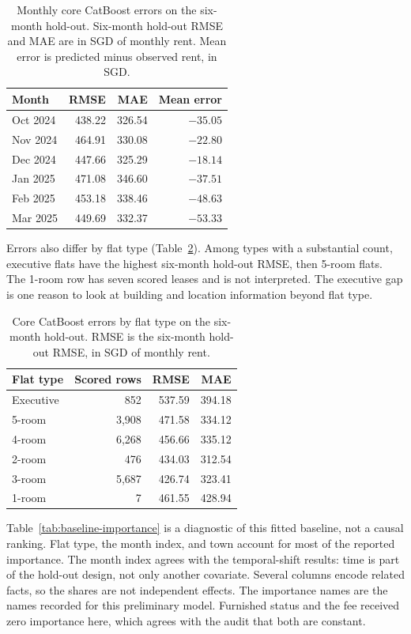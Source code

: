 \documentclass[11pt,a4paper]{article}
\begin{document}
\begin{table}[htbp]
\centering
\caption{Monthly core CatBoost errors on the six-month hold-out.
Six-month hold-out RMSE and MAE are in SGD of monthly rent.
Mean error is predicted minus observed rent, in SGD.}
\label{tab:monthly-errors}
\small
\begin{tabular}{lrrr}
\toprule
Month & RMSE & MAE & Mean error \\
\midrule
Oct 2024 & 438.22 & 326.54 & $-35.05$ \\
Nov 2024 & 464.91 & 330.08 & $-22.80$ \\
Dec 2024 & 447.66 & 325.29 & $-18.14$ \\
Jan 2025 & 471.08 & 346.60 & $-37.51$ \\
Feb 2025 & 453.18 & 338.46 & $-48.63$ \\
Mar 2025 & 449.69 & 332.37 & $-53.33$ \\
\bottomrule
\end{tabular}
\end{table}

Errors also differ by flat type (Table~\ref{tab:flat-type-errors}).
Among types with a substantial count, executive flats have the highest six-month hold-out RMSE, then 5-room flats.
The 1-room row has seven scored leases and is not interpreted.
The executive gap is one reason to look at building and location information beyond flat type.

\begin{table}[htbp]
\centering
\caption{Core CatBoost errors by flat type on the six-month hold-out.
RMSE is the six-month hold-out RMSE, in SGD of monthly rent.}
\label{tab:flat-type-errors}
\small
\begin{tabular}{lrrr}
\toprule
Flat type & Scored rows & RMSE & MAE \\
\midrule
Executive & 852 & 537.59 & 394.18 \\
5-room & 3{,}908 & 471.58 & 334.12 \\
4-room & 6{,}268 & 456.66 & 335.12 \\
2-room & 476 & 434.03 & 312.54 \\
3-room & 5{,}687 & 426.74 & 323.41 \\
1-room & 7 & 461.55 & 428.94 \\
\bottomrule
\end{tabular}
\end{table}

Table~\ref{tab:baseline-importance} is a diagnostic of this fitted baseline, not a causal ranking.
Flat type, the month index, and town account for most of the reported importance.
The month index agrees with the temporal-shift results: time is part of the hold-out design, not only another covariate.
Several columns encode related facts, so the shares are not independent effects.
The importance names are the names recorded for this preliminary model.
Furnished status and the fee received zero importance here, which agrees with the audit that both are constant.
\end{document}
